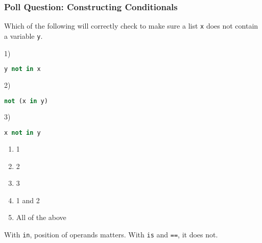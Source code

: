 \documentclass{beamer}
\begin{document}
%
%
\begin{frame}[fragile]
	\frametitle{Poll Question: Constructing Conditionals}
  Which of the following will correctly check to make sure a list \lstinline|x| does not contain a variable \lstinline|y|.

	\begin{minipage}{0.69\textwidth}
    1)
		\begin{lstlisting}[language=Python, autogobble,basicstyle=\tiny,numbers=none]
    y not in x
		\end{lstlisting}
    \vspace{1cm}
    2)
		\begin{lstlisting}[language=Python, autogobble,basicstyle=\tiny,numbers=none]
    not (x in y)
		\end{lstlisting}
    \vspace{1cm}
    3)
		\begin{lstlisting}[language=Python, autogobble,basicstyle=\tiny,numbers=none]
    x not in y
		\end{lstlisting}
	\end{minipage}
	\begin{minipage}{0.29\textwidth}
    \begin{enumerate}[A]
      \item 1
      \item 2
      \item 3
      \item 1 and 2
      \item All of the above
    \end{enumerate}
	\end{minipage}
  \pause
  With \lstinline|in|, position of operands matters. With \lstinline|is| and \lstinline|==|, it does not.
\end{frame}
\end{document}
